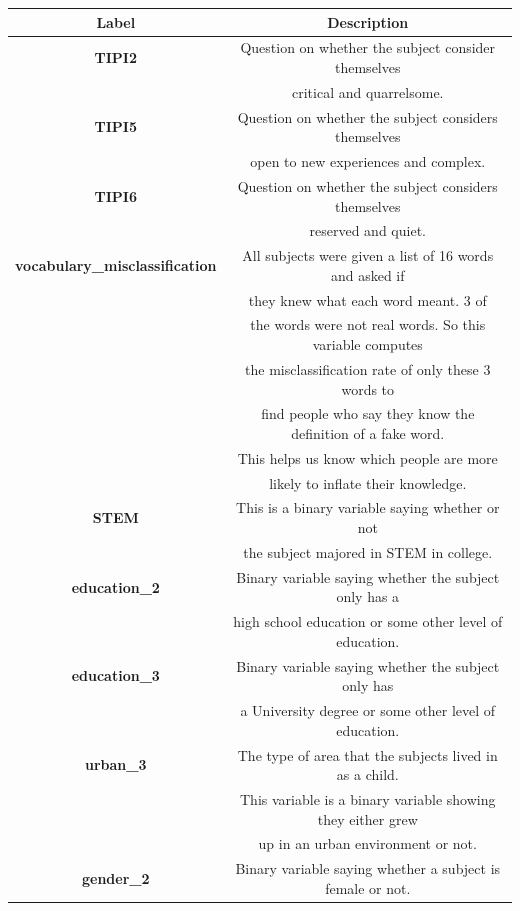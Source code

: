 \documentclass{article}[11pt]
\begin{document}
    \begin{tabular}{ c|c }
        Label & Description \\
        \hline
        \textbf{TIPI2} & Question on whether the subject consider themselves \\ & critical and quarrelsome. \\
        \hline
        \textbf{TIPI5} & Question on whether the subject considers themselves \\ & open to new experiences and complex. \\
        \hline
        \textbf{TIPI6} & Question on whether the subject considers themselves \\ & reserved and quiet. \\
        \hline
        \textbf{vocabulary\_misclassification} & All subjects were given a list of 16 words and asked if \\ & they knew what each word meant. 3 of \\ & the words were not real words. So this variable computes \\ & the misclassification rate of only these 3 words to \\ & find people who say they know the definition of a fake word. \\ & This helps us know which people are more \\ & likely to inflate their knowledge. \\
        \hline
        \textbf{STEM} & This is a binary variable saying whether or not \\ & the subject majored in STEM in college. \\
        \hline
        \textbf{education\_2} & Binary variable saying whether the subject only has a \\ & high school education or some other level of education. \\
        \hline
        \textbf{education\_3}  & Binary variable saying whether the subject only has \\ & a University degree or some other level of education. \\
        \hline
        \textbf{urban\_3} & The type of area that the subjects lived in as a child. \\ & This variable is a binary variable showing they either grew \\ & up in an urban environment or not. \\
        \hline
        \textbf{gender\_2} & Binary variable saying whether a subject is female or not. \\

\end{tabular}
\end{document}
